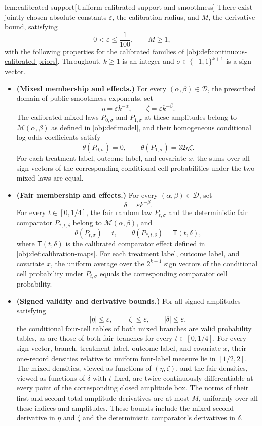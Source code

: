 \documentclass[11pt]{article}
\begin{document}
\begin{lemmav}{lem:calibrated-support}[Uniform calibrated support and smoothness]
There exist jointly chosen absolute constants \(\varepsilon\), the calibration radius, and \(M\), the derivative bound, satisfying
\[
0<\varepsilon\le \frac{1}{100},
\qquad M\ge 1,
\]
with the following properties for the calibrated families of \cref{obj:def:continuous-calibrated-priors}. Throughout, \(k\ge1\) is an integer and \(\sigma\in\{-1,1\}^{k+1}\) is a sign vector.

\begin{itemize}
\item \textbf{(Mixed membership and effects.)}
For every \((\alpha,\beta)\in\mathcal D\), the prescribed domain of public smoothness exponents, set
\[
\eta=\varepsilon k^{-\alpha},
\qquad
\zeta=\varepsilon k^{-\beta}.
\]
The calibrated mixed laws \(P_{0,\sigma}\) and \(P_{1,\sigma}\) at these amplitudes belong to \(\mathcal M(\alpha,\beta)\) as defined in \cref{obj:def:model}, and their homogeneous conditional log-odds coefficients satisfy
\[
\theta(P_{0,\sigma})=0,
\qquad
\theta(P_{1,\sigma})=32\eta\zeta.
\]
For each treatment label, outcome label, and covariate \(x\), the sums over all sign vectors of the corresponding conditional cell probabilities under the two mixed laws are equal.

\item \textbf{(Fair membership and effects.)}
For every \((\alpha,\beta)\in\mathcal D\), set
\[
\delta=\varepsilon k^{-\beta}.
\]
For every \(t\in[0,1/4]\), the fair random law \(P_{t,\sigma}\) and the deterministic fair comparator \(P_{*,t,\delta}\) belong to \(\mathcal M(\alpha,\beta)\), and
\[
\theta(P_{t,\sigma})=t,
\qquad
\theta(P_{*,t,\delta})=\mathsf T(t,\delta),
\]
where \(\mathsf T(t,\delta)\) is the calibrated comparator effect defined in \cref{obj:def:calibration-maps}. For each treatment label, outcome label, and covariate \(x\), the uniform average over the \(2^{k+1}\) sign vectors of the conditional cell probability under \(P_{t,\sigma}\) equals the corresponding comparator cell probability.

\item \textbf{(Signed validity and derivative bounds.)}
For all signed amplitudes satisfying
\[
|\eta|\le\varepsilon,
\qquad
|\zeta|\le\varepsilon,
\qquad
|\delta|\le\varepsilon,
\]
the conditional four-cell tables of both mixed branches are valid probability tables, as are those of both fair branches for every \(t\in[0,1/4]\). For every sign vector, branch, treatment label, outcome label, and covariate \(x\), their one-record densities relative to uniform four-label measure lie in \([1/2,2]\). The mixed densities, viewed as functions of \((\eta,\zeta)\), and the fair densities, viewed as functions of \(\delta\) with \(t\) fixed, are twice continuously differentiable at every point of the corresponding closed amplitude box. The norms of their first and second total amplitude derivatives are at most \(M\), uniformly over all these indices and amplitudes. These bounds include the mixed second derivative in \(\eta\) and \(\zeta\) and the deterministic comparator's derivatives in \(\delta\).


\end{itemize}
\end{lemmav}
\end{document}
